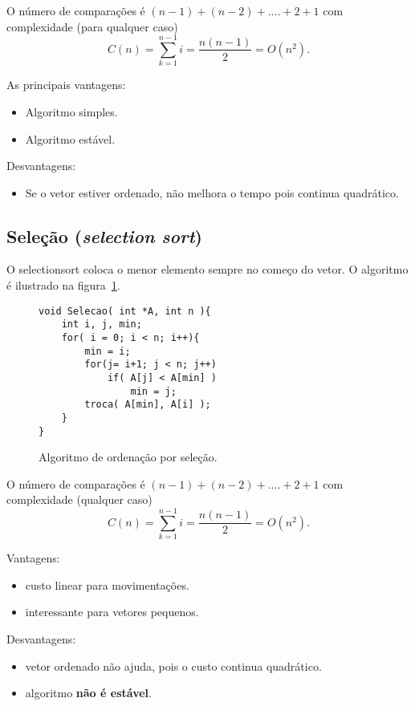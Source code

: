 
O número de comparações é $(n-1)+(n-2)+....+2+1$ com complexidade (para qualquer caso)
\begin{equation*}
C(n) = \sum_{k=1}^{n-1} i = \frac{n(n-1)}{2} = O(n^2).
\end{equation*}

As principais vantagens:
\begin{itemize}
\item Algoritmo simples.
\item Algoritmo estável.
\end{itemize}
Desvantagens:
\begin{itemize}
\item Se o vetor estiver ordenado, não melhora o tempo pois continua quadrático.
\end{itemize}

\subsection{Seleção (\emph{selection sort})}

O selectionsort coloca o menor elemento sempre no começo do vetor.
O algoritmo é ilustrado na figura~\ref{aula03:algo:selection}.
\begin{figure}[!htb]
\centering
\begin{framed}
\begin{lstlisting}
void Selecao( int *A, int n ){
	int i, j, min;
	for( i = 0; i < n; i++){
		min = i;
		for(j= i+1; j < n; j++)
			if( A[j] < A[min] )
				min = j;
		troca( A[min], A[i] );
	}
}
\end{lstlisting}
\end{framed}
\caption{Algoritmo de ordenação por seleção.}
\label{aula03:algo:selection}
\end{figure}


O número de comparações é $(n-1)+(n-2)+....+2+1$ com complexidade (qualquer caso)
\begin{equation*}
C(n) = \sum_{k=1}^{n-1} i = \frac{n(n-1)}{2} = O(n^2).
\end{equation*}

Vantagens:
\begin{itemize}
\item custo linear para movimentações.
\item interessante para vetores pequenos.
\end{itemize}
Desvantagens:
\begin{itemize}
\item vetor ordenado não ajuda, pois o custo continua quadrático.
\item algoritmo {\bf não é estável}.
\end{itemize}

